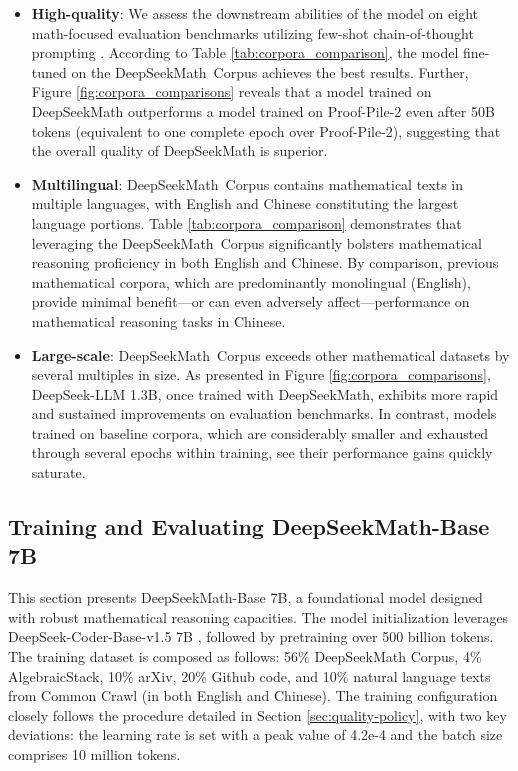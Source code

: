 \begin{itemize}[topsep=0pt]
\begin{itemize}[topsep=0pt]
    \item \textbf{High-quality}:
    We assess the downstream abilities of the model on eight math-focused evaluation benchmarks utilizing few-shot chain-of-thought prompting \cite{cot}. According to Table \ref{tab:corpora_comparison}, the model fine-tuned on the DeepSeekMath~Corpus achieves the best results. Further, Figure \ref{fig:corpora_comparisons} reveals that a model trained on DeepSeekMath outperforms a model trained on Proof-Pile-2 even after 50B tokens (equivalent to one complete epoch over Proof-Pile-2), suggesting that the overall quality of DeepSeekMath is superior. 
    \item \textbf{Multilingual}:
    DeepSeekMath~Corpus contains mathematical texts in multiple languages, with English and Chinese constituting the largest language portions. Table \ref{tab:corpora_comparison} demonstrates that leveraging the DeepSeekMath~Corpus significantly bolsters mathematical reasoning proficiency in both English and Chinese. By comparison, previous mathematical corpora, which are predominantly monolingual (English), provide minimal benefit—or can even adversely affect—performance on mathematical reasoning tasks in Chinese.
    \item \textbf{Large-scale}:
    DeepSeekMath~Corpus exceeds other mathematical datasets by several multiples in size. As presented in Figure \ref{fig:corpora_comparisons}, DeepSeek-LLM 1.3B, once trained with DeepSeekMath, exhibits more rapid and sustained improvements on evaluation benchmarks. In contrast, models trained on baseline corpora, which are considerably smaller and exhausted through several epochs within training, see their performance gains quickly saturate.
\end{itemize}

\subsection{Training and Evaluating DeepSeekMath-Base 7B}

This section presents DeepSeekMath-Base 7B, a foundational model designed with robust mathematical reasoning capacities. The model initialization leverages DeepSeek-Coder-Base-v1.5 7B \citep{deepseek-coder}, followed by pretraining over 500 billion tokens. The training dataset is composed as follows: 56\% DeepSeekMath Corpus, 4\% AlgebraicStack, 10\% arXiv, 20\% Github code, and 10\% natural language texts from Common Crawl (in both English and Chinese). The training configuration closely follows the procedure detailed in Section \ref{sec:quality-policy}, with two key deviations: the learning rate is set with a peak value of 4.2e-4 and the batch size comprises 10 million tokens.


\end{itemize}
